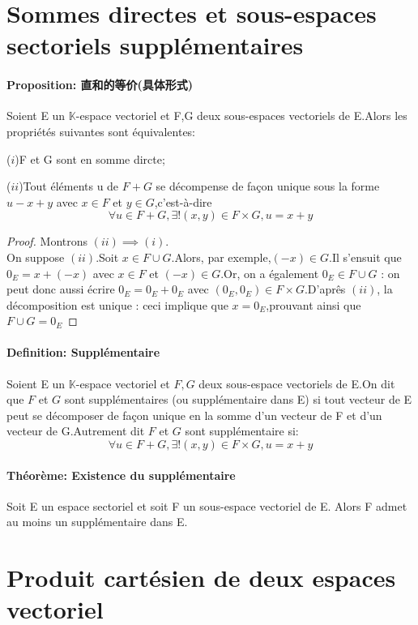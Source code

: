 \documentclass[12pt]{book}
\theoremstyle{definition}\newtheorem{dfn}{Définition}[chapter]
\theoremstyle{plain}\newtheorem{thm}{Théorème}[chapter]
\theoremstyle{plain}\newtheorem{prp}{Proposition}[chapter]
\theoremstyle{plain}\newtheorem{lem}{\bf Lemme}[chapter]
\theoremstyle{plain}\newtheorem{axm}{\bf Axiome}[chapter]
\theoremstyle{plain}\newtheorem{lmm}{\bf Lemme}[chapter]
\theoremstyle{plain}\newtheorem{exm}{\bf Example}[chapter]
\theoremstyle{plain}\newtheorem{cor}{\bf Corollaire}[chapter]
\theoremstyle{remark}\newtheorem{rem}{Remarque}[chapter]
\begin{document}
\section{Sommes directes et sous-espaces sectoriels supplémentaires}

\paragraph{Proposition: 直和的等价(具体形式)}
Soient E un $\mathbb{K}$-espace vectoriel et F,G deux sous-espaces vectoriels de E.Alors les propriétés suivantes sont équivalentes:

($i$)F et G sont en somme dircte;

($ii$)Tout éléments u de $F+G$ se décompense de façon unique sous la forme $u-x+y$ avec $x\in F$ et $y\in G$,c'est-à-dire $$\forall u\in F+G, \exists!(x,y)\in F\times G, u=x+y$$
\begin{proof}
        Montrons $(ii)\implies(i)$.
\\
On suppose $(ii)$.Soit $x\in F\cup G$.Alors, par exemple,$(-x)\in G$.Il s'ensuit que $0_E=x+(-x)$ avec $x\in F$ et $(-x)\in G$.Or, on a également $0_E\in F\cup G$ : on peut donc aussi écrire $0_E=0_E+0_E$ avec $(0_E,0_E)\in F\times G$.D'aprês $(ii)$, la décomposition est unique :
ceci implique que $x=0_E$,prouvant ainsi que $F\cup G={0_E}$
\end{proof}
\paragraph{Definition: Supplémentaire}
Soient E un $\mathbb{K}$-espace vectoriel et $F,G$ deux sous-espace vectoriels de E.On dit que $F$ et $G$ sont supplémentaires (ou supplémentaire dans E) si tout vecteur de E peut se décomposer de façon unique en la somme d'un vecteur de F et d'un vecteur de G.Autrement dit $F$ et $G$ sont supplémentaire si:
$$
\forall u\in F+G, \exists!(x,y)\in F\times G, u=x+y
$$

\paragraph{Théorème: Existence du supplémentaire}
Soit E un espace sectoriel et soit F un sous-espace vectoriel de E. Alors F admet au moins un supplémentaire dans E.

\section{Produit cartésien de deux espaces vectoriel}
\end{document}
